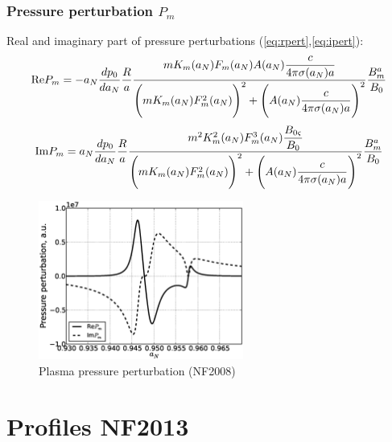 \documentclass[11pt,oneside,a4paper,notitlepage]{article}
\begin{document}
\section{Pressure perturbation $P_m$}
Real and imaginary part of pressure perturbations (\ref{eq:rpert},\ref{eq:ipert}):
\begin{equation} \label{eq:rpert}
 \textnormal{Re}P_m=-a_N\frac{dp_0}{da_N}\frac{R}{a} \\
 \frac{mK_m(a_N)F_m(a_N)A(a_N)\dfrac{c}{4\pi\sigma(a_N)a}}{\Bigg( \\
 mK_m(a_N)F_m^2(a_N) \Bigg)^2 + \Bigg( \\
 A(a_N) \dfrac{c}{4\pi\sigma(a_N)a} \Bigg)^2}\\
 \frac{B_m^a}{B_0}
\end{equation}
\begin{equation} \label{eq:ipert}
 \textnormal{Im}P_m=a_N\frac{dp_0}{da_N}\frac{R}{a} \\
 \frac{m^2K_m^2(a_N)F_m^3(a_N)\dfrac{B_{0\varsigma}}{B_0}}{\Bigg( \\
 mK_m(a_N)F_m^2(a_N) \Bigg)^2 + \Bigg( \\
 A(a_N) \dfrac{c}{4\pi\sigma(a_N)a} \Bigg)^2}\frac{B_m^a}{B_0}
\end{equation}
\begin{figure}[h!]
 \centering
 \includegraphics[width=0.6\textwidth]{perturbation.eps}
 \caption{Plasma pressure perturbation (NF2008)}
 \label{fig:pert}
\end{figure}

\newpage
\part{Profiles NF2013}
\end{document}
